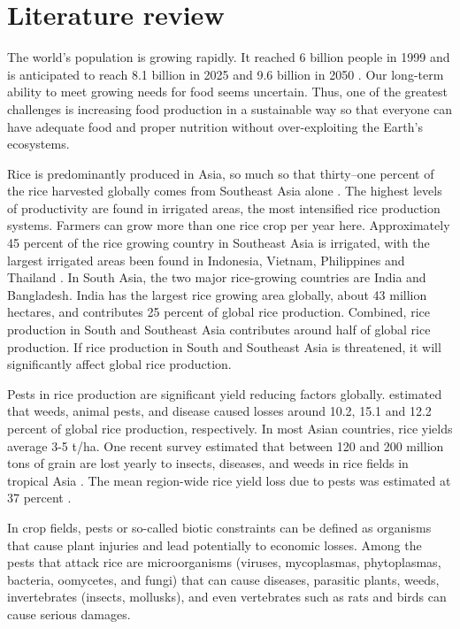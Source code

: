 \section{Literature review}

The world's population is growing rapidly.  It reached 6 billion people in 1999 and is anticipated to reach 8.1 billion in 2025 and 9.6 billion in 2050 \citep{Alexandratos_2012_World}.  Our long-term ability to meet growing needs for food seems uncertain.  Thus, one of the greatest challenges is increasing food production in a sustainable way so that everyone can have adequate food and proper nutrition without over-exploiting the Earth's ecosystems. 

Rice is predominantly produced in Asia, so much so that thirty--one percent of the rice harvested globally comes from Southeast Asia alone \citep{OECD_2012_Agricultural}. The highest levels of productivity are found in irrigated areas, the most intensified rice production systems. Farmers can grow more than one rice crop per year here. Approximately 45 percent of the rice growing country in Southeast Asia is irrigated, with the largest irrigated areas been found in Indonesia, Vietnam, Philippines and Thailand \citep{Mutert_2002_Developments}. In South Asia, the two major rice-growing countries are India and Bangladesh. India has the largest rice growing area globally, about 43 million hectares, and contributes 25 percent of global rice production. Combined, rice production in South and Southeast Asia contributes around half of global rice production. If rice production in South and Southeast Asia is threatened, it will significantly affect global rice production.

Pests in rice production are significant yield reducing factors globally. \cite{Oerke_2005_Crop} estimated that weeds, animal pests, and disease caused losses around 10.2, 15.1 and 12.2 percent of global rice production, respectively. In most Asian countries, rice yields average 3-5 t/ha.  One recent survey estimated that between 120 and 200 million tons of grain are lost yearly to insects, diseases, and weeds in rice fields in tropical Asia \citep{Willocquet_2004_Research}. The mean region-wide rice yield loss due to pests was estimated at 37 percent \citep{Savary_2000_Quantification}.

In crop fields, pests or so-called biotic constraints can be defined as organisms that cause plant injuries and lead potentially to economic losses. Among the pests that attack rice are microorganisms (viruses, mycoplasmas, phytoplasmas, bacteria, oomycetes, and fungi) that can cause diseases, parasitic plants, weeds, invertebrates (insects, mollusks), and even vertebrates such as rats and birds can cause serious damages.

